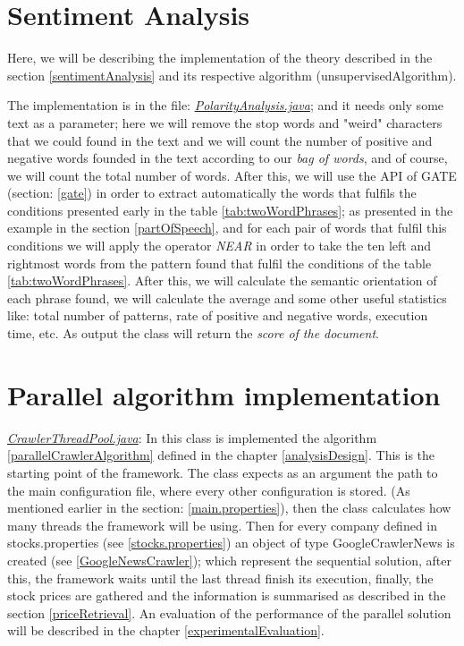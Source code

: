 \section{Sentiment Analysis}

Here, we will be describing the implementation of the theory described in the section \ref{sentimentAnalysis} and its respective algorithm ({unsupervisedAlgorithm}).

The implementation is in the file: \emph{\ul{PolarityAnalysis.java}}; and it needs only some text as a parameter; here we will remove the stop words and "weird" characters that we could found in the text and we will count the number of positive and negative words founded in the text according to our \emph{bag of words}, and of course, we will count the total number of words. After this, we will use the API of GATE (section: \ref{gate}) in order to extract automatically the words that fulfils the conditions presented early in the table \ref{tab:twoWordPhrases}; as presented in the example in the section \ref{partOfSpeech}, and for each pair of words that fulfil this conditions we will apply the operator \emph{NEAR} in order to take the ten left and rightmost words from the pattern found that fulfil the conditions of the table \ref{tab:twoWordPhrases}. After this, we will calculate the semantic orientation of each phrase found, we will calculate the average and some other useful statistics like: total number of patterns, rate of positive and negative words, execution time, etc. As output the class will return the \emph{score of the document}.

\section{Parallel algorithm implementation}\label{parallelImplementation}

\emph{\ul{CrawlerThreadPool.java}}: In this class is implemented the algorithm \ref{parallelCrawlerAlgorithm} defined in the chapter \ref{analysisDesign}. This is the starting point of the framework. The class expects as an argument the path to the main configuration file, where every other configuration is stored. (As mentioned earlier in the section: \ref{main.properties}), then the class calculates how many threads the framework will be using. Then for every company defined in stocks.properties (see \ref{stocks.properties}) an object of type GoogleCrawlerNews is created (see \ref{GoogleNewsCrawler}); which represent the sequential solution, after this, the framework waits until the last thread finish its execution, finally, the stock prices are gathered and the information is summarised as described in the section \ref{priceRetrieval}. An evaluation of the performance of the parallel solution will be described in the chapter \ref{experimentalEvaluation}.
 
